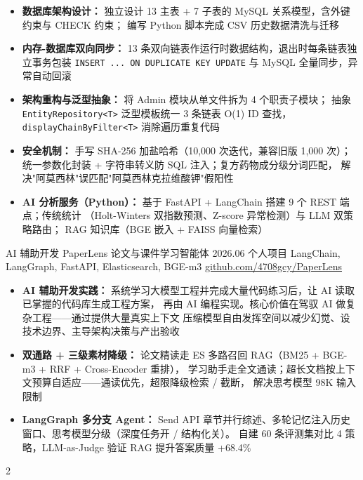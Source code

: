 \documentclass[10pt,a4paper,ragged2e]{maltacv}
\begin{document}
\begin{itemize}
  \item \textbf{数据库架构设计：}
        独立设计 13 主表 + 7 子表的 MySQL 关系模型，含外键约束与 CHECK 约束；
        编写 Python 脚本完成 CSV 历史数据清洗与迁移

  \item \textbf{内存-数据库双向同步：}
        13 条双向链表作运行时数据结构，退出时每条链表独立事务包装
        \texttt{INSERT ... ON DUPLICATE KEY UPDATE} 与 MySQL 全量同步，异常自动回滚

  \item \textbf{架构重构与泛型抽象：}
        将 Admin 模块从单文件拆为 4 个职责子模块；
        抽象 \texttt{EntityRepository<T>} 泛型模板统一 3 条链表 O(1) ID 查找，
        \texttt{displayChainByFilter<T>} 消除遍历重复代码

  \item \textbf{安全机制：}
        手写 SHA-256 加盐哈希（10,000 次迭代，兼容旧版 1,000 次）；
        统一参数化封装 + 字符串转义防 SQL 注入；复方药物成分级分词匹配，
        解决"阿莫西林"误匹配"阿莫西林克拉维酸钾"假阳性

  \item \textbf{AI 分析服务（Python）：}
        基于 FastAPI + LangChain 搭建 9 个 REST 端点；传统统计
        （Holt-Winters 双指数预测、Z-score 异常检测）与 LLM 双策略路由；
        RAG 知识库（BGE 嵌入 + FAISS 向量检索）
\end{itemize}

\medskip

\cvexperience
{AI 辅助开发}
{PaperLens 论文与课件学习智能体}
{2026.06}
{个人项目}
{LangChain, LangGraph, FastAPI, Elasticsearch, BGE-m3 \quad \href{https://github.com/4708gcy/PaperLens}{github.com/4708gcy/PaperLens}}

\begin{itemize}
  \item \textbf{AI 辅助开发实践：}
        系统学习大模型工程并完成大量代码练习后，让 AI 读取已掌握的代码库生成工程方案，
        再由 AI 编程实现。核心价值在驾驭 AI 做复杂工程——通过提供大量真实上下文
        压缩模型自由发挥空间以减少幻觉、设技术边界、主导架构决策与产出验收

  \item \textbf{双通路 + 三级素材降级：}
        论文精读走 ES 多路召回 RAG（BM25 + BGE-m3 + RRF + Cross-Encoder 重排），
        学习助手走全文通读；超长文档按上下文预算自适应——通读优先，超限降级检索 / 截断，
        解决思考模型 98K 输入限制

  \item \textbf{LangGraph 多分支 Agent：}
        Send API 章节并行综述、多轮记忆注入历史窗口、思考模型分级（深度任务开 / 结构化关）。
        自建 60 条评测集对比 4 策略，LLM-as-Judge 验证 RAG 提升答案质量 +68.4\%
\end{itemize}

\medskip

\begin{multicols}{2}

  \vfill\null
  \columnbreak

\end{multicols}
\end{document}
